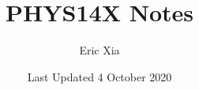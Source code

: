 \documentclass{article}
\title{PHYS14X Notes}
\author{Eric Xia}
\date{Last Updated 4 October 2020}
\begin{document}
    \maketitle
    \tableofcontents
    \pagebreak



    
    
    
    
    
\end{document}
